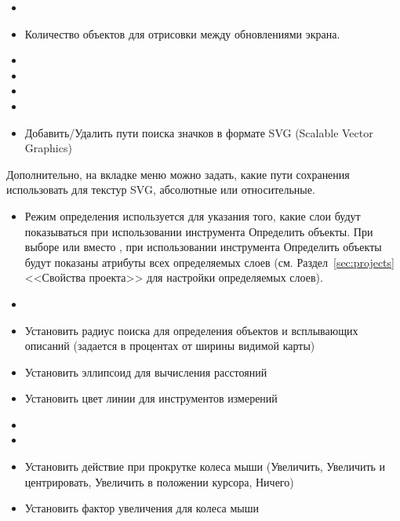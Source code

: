 
\begin{itemize}
\item {}
\item Количество объектов для отрисовки между обновлениями экрана.
\item {}
\item {}
\item {}
\item {}
\item Добавить/Удалить пути поиска значков в формате SVG (Scalable Vector Graphics)
\end{itemize}

Дополнительно, на вкладке  меню  \arrow
{} можно задать, какие пути
сохранения использовать для текстур SVG, абсолютные или относительные.


\begin{itemize}
\item Режим определения используется для указания того, какие слои будут
показываться при использовании инструмента Определить объекты. При выборе
 или 
вместо , при использовании инструмента Определить
объекты будут показаны атрибуты всех определяемых слоев (см. Раздел~\ref{sec:projects}
<<Свойства проекта>> для настройки определяемых слоев).
\item {}
\item Установить радиус поиска для определения объектов и всплывающих
описаний (задается в процентах от ширины видимой карты)
\item Установить эллипсоид для вычисления расстояний
\item Установить цвет линии для инструментов измерений
\item {}
\item {}
\item Установить действие при прокрутке колеса мыши (Увеличить, Увеличить
и центрировать, Увеличить в положении курсора, Ничего)
\item Установить фактор увеличения для колеса мыши
\end{itemize}

